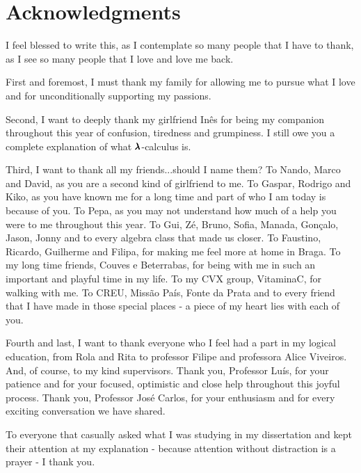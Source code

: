 \chapter*{Acknowledgments}

I feel blessed to write this, as I contemplate so many people that I have to thank, as I see so many people that I love and love me back.

First and foremost, I must thank my family for allowing me to pursue what I love and for unconditionally supporting my passions.

Second, I want to deeply thank my girlfriend Inês for being my companion throughout this year of confusion, tiredness and grumpiness.
I still owe you a complete explanation of what $\pmb{\lambda}$-calculus is.

Third, I want to thank all my friends...should I name them?
To Nando, Marco and David, as you are a second kind of girlfriend to me.
To Gaspar, Rodrigo and Kiko, as you have known me for a long time and part of who I am today is because of you.
To Pepa, as you may not understand how much of a help you were to me throughout this year.
To Gui, Zé, Bruno, Sofia, Manada, Gonçalo, Jason, Jonny and to every algebra class that made us closer.
To Faustino, Ricardo, Guilherme and Filipa, for making me feel more at home in Braga.
To my long time friends, Couves e Beterrabas, for being with me in such an important and playful time in my life.
To my CVX group, VitaminaC, for walking with me.
To CREU, Missão País, Fonte da Prata and to every friend that I have made in those special places - a piece of my heart lies with each of you.

Fourth and last, I want to thank everyone who I feel had a part in my logical education, from Rola and Rita to professor Filipe and professora Alice Viveiros.
And, of course, to my kind supervisors.
Thank you, Professor Luís, for your patience and for your focused, optimistic and close help throughout this joyful process.
Thank you, Professor José Carlos, for your enthusiasm and for every exciting conversation we have shared.

To everyone that casually asked what I was studying in my dissertation and kept their attention at my explanation - because attention without distraction is a prayer - I thank you.

